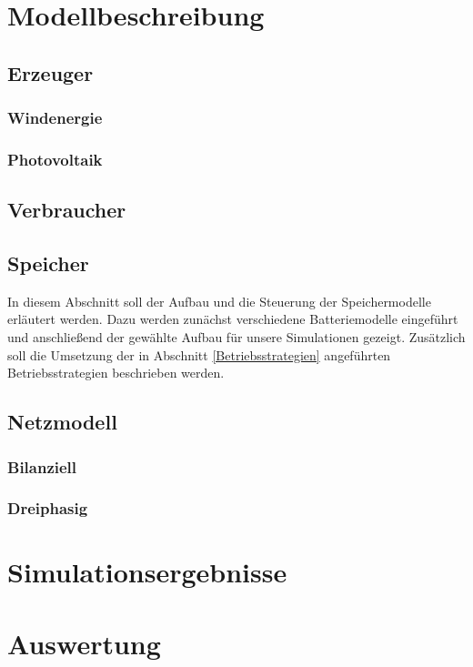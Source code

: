 \chapter{Modellbeschreibung}\label{Modellbeschreibung}
\section{Erzeuger}
\subsection{Windenergie}
\subsection{Photovoltaik}
\section{Verbraucher}
\section{Speicher}\label{Speicher}
In diesem Abschnitt soll der Aufbau und die Steuerung der Speichermodelle erläutert werden.
Dazu werden zunächst verschiedene Batteriemodelle eingeführt und anschließend der gewählte Aufbau für
unsere Simulationen gezeigt. 
Zusätzlich soll die Umsetzung der in Abschnitt \ref{Betriebsstrategien} angeführten Betriebsstrategien 
beschrieben werden.

\section{Netzmodell}
\subsection{Bilanziell}
\subsection{Dreiphasig}


\chapter{Simulationsergebnisse}

\chapter{Auswertung}